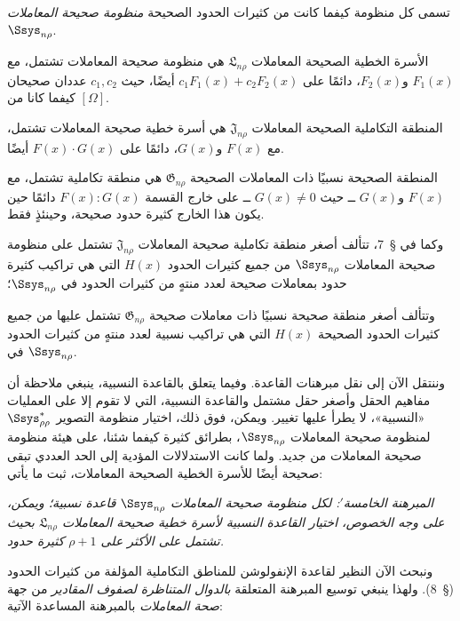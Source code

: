 \documentclass[11pt]{article}
\providecommand{\Lsys}{\mathfrak{L}}
\providecommand{\Jdom}{\mathfrak{J}}
\providecommand{\Gdom}{\mathfrak{G}}
\begin{document}
تسمى كل منظومة كيفما كانت من كثيرات الحدود الصحيحة \emph{منظومة صحيحة المعاملات} $\Ssys_{n\rho}$.

الأسرة الخطية الصحيحة المعاملات $\Lsys_{n\rho}$ هي منظومة صحيحة المعاملات تشتمل، مع $F_1(x)$ و$F_2(x)$، دائمًا على $c_1F_1(x)+c_2F_2(x)$ أيضًا، حيث $c_1,c_2$ عددان صحيحان كيفما كانا من $[\Omega]$.

المنطقة التكاملية الصحيحة المعاملات $\Jdom_{n\rho}$ هي أسرة خطية صحيحة المعاملات تشتمل، مع $F(x)$ و$G(x)$، دائمًا على $F(x)\cdot G(x)$ أيضًا.

المنطقة الصحيحة نسبيًا ذات المعاملات الصحيحة $\Gdom_{n\rho}$ هي منطقة تكاملية تشتمل، مع $F(x)$ و$G(x)$ ــ حيث $G(x)\ne0$ ــ على خارج القسمة $F(x):G(x)$ دائمًا حين يكون هذا الخارج كثيرة حدود صحيحة، وحينئذٍ فقط.

وكما في \S\ 7، تتألف أصغر منطقة تكاملية صحيحة المعاملات $\Jdom_{n\rho}$ تشتمل على منظومة صحيحة المعاملات $\Ssys_{n\rho}$ من جميع كثيرات الحدود $H(x)$ التي هي تراكيب كثيرة حدود بمعاملات صحيحة لعدد منتهٍ من كثيرات الحدود في $\Ssys_{n\rho}$؛

وتتألف أصغر منطقة صحيحة نسبيًا ذات معاملات صحيحة $\Gdom_{n\rho}$ تشتمل عليها من جميع كثيرات الحدود الصحيحة $H(x)$ التي هي تراكيب نسبية لعدد منتهٍ من كثيرات الحدود في $\Ssys_{n\rho}$.

وننتقل الآن إلى نقل مبرهنات القاعدة. وفيما يتعلق بالقاعدة النسبية، ينبغي ملاحظة أن مفاهيم الحقل وأصغر حقل مشتمل والقاعدة النسبية، التي لا تقوم إلا على العمليات «النسبية»، لا يطرأ عليها تغيير. ويمكن، فوق ذلك، اختيار منظومة التصوير $\Ssys^*_{\rho\rho}$ لمنظومة صحيحة المعاملات $\Ssys_{n\rho}$، بطرائق كثيرة كيفما شئنا، على هيئة منظومة صحيحة المعاملات من جديد. ولما كانت الاستدلالات المؤدية إلى الحد العددي تبقى صحيحة أيضًا للأسرة الخطية الصحيحة المعاملات، ثبت ما يأتي:

\emph{المبرهنة الخامسة$'$: لكل منظومة صحيحة المعاملات $\Ssys_{n\rho}$ قاعدة نسبية؛ ويمكن، على وجه الخصوص، اختيار القاعدة النسبية لأسرة خطية صحيحة المعاملات $\Lsys_{n\rho}$ بحيث تشتمل على الأكثر على $\rho+1$ كثيرة حدود.}

ونبحث الآن النظير لقاعدة الإنفولوشن للمناطق التكاملية المؤلفة من كثيرات الحدود (\S\ 8). ولهذا ينبغي توسيع المبرهنة المتعلقة \emph{بالدوال المتناظرة لصفوف المقادير} من جهة \emph{صحة المعاملات} بالمبرهنة المساعدة الآتية:
\end{document}
